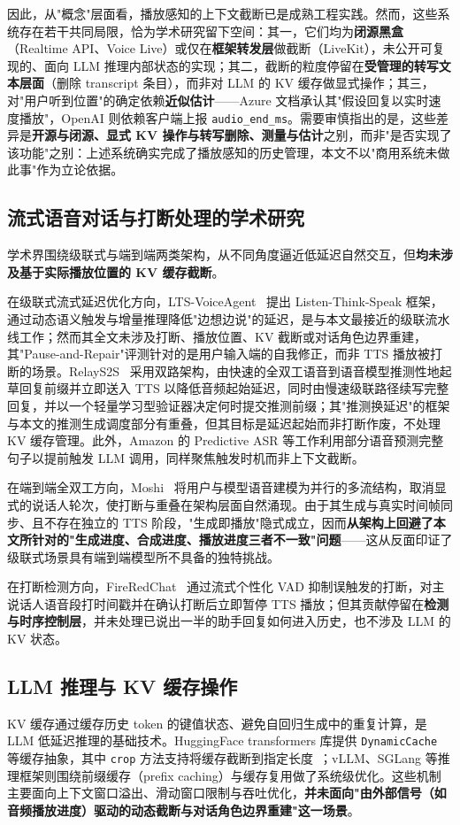 \documentclass[conference]{IEEEtran}
\theoremstyle{definition}
\begin{document}
因此，从"概念"层面看，播放感知的上下文截断已是成熟工程实践。然而，这些系统存在若干共同局限，恰为学术研究留下空间：其一，它们均为\textbf{闭源黑盒}（Realtime API、Voice Live）或仅在\textbf{框架转发层}做截断（LiveKit），未公开可复现的、面向 LLM 推理内部状态的实现；其二，截断的粒度停留在\textbf{受管理的转写文本层面}（删除 transcript 条目），而非对 LLM 的 KV 缓存做显式操作；其三，对"用户听到位置"的确定依赖\textbf{近似估计}——Azure 文档承认其"假设回复以实时速度播放"，OpenAI 则依赖客户端上报 \texttt{audio\_end\_ms}。需要审慎指出的是，这些差异是\textbf{开源与闭源、显式 KV 操作与转写删除、测量与估计}之别，而非"是否实现了该功能"之别：上述系统确实完成了播放感知的历史管理，本文不以"商用系统未做此事"作为立论依据。

\subsection{流式语音对话与打断处理的学术研究}
学术界围绕级联式与端到端两类架构，从不同角度逼近低延迟自然交互，但\textbf{均未涉及基于实际播放位置的 KV 缓存截断}。

在级联式流式延迟优化方向，LTS-VoiceAgent~\cite{lts_voiceagent} 提出 Listen-Think-Speak 框架，通过动态语义触发与增量推理降低"边想边说"的延迟，是与本文最接近的级联流水线工作；然而其全文未涉及打断、播放位置、KV 截断或对话角色边界重建，其"Pause-and-Repair"评测针对的是用户输入端的自我修正，而非 TTS 播放被打断的场景。RelayS2S~\cite{relays2s} 采用双路架构，由快速的全双工语音到语音模型推测性地起草回复前缀并立即送入 TTS 以降低音频起始延迟，同时由慢速级联路径续写完整回复，并以一个轻量学习型验证器决定何时提交推测前缀；其"推测换延迟"的框架与本文的推测生成调度部分有重叠，但其目标是延迟起始而非打断作废，不处理 KV 缓存管理。此外，Amazon 的 Predictive ASR 等工作利用部分语音预测完整句子以提前触发 LLM 调用，同样聚焦触发时机而非上下文截断。

在端到端全双工方向，Moshi~\cite{moshi} 将用户与模型语音建模为并行的多流结构，取消显式的说话人轮次，使打断与重叠在架构层面自然涌现。由于其生成与真实时间帧同步、且不存在独立的 TTS 阶段，"生成即播放"隐式成立，因而\textbf{从架构上回避了本文所针对的"生成进度、合成进度、播放进度三者不一致"问题}——这从反面印证了级联式场景具有端到端模型所不具备的独特挑战。

在打断检测方向，FireRedChat~\cite{fireredchat} 通过流式个性化 VAD 抑制误触发的打断，对主说话人语音段打时间戳并在确认打断后立即暂停 TTS 播放；但其贡献停留在\textbf{检测与时序控制层}，并未处理已说出一半的助手回复如何进入历史，也不涉及 LLM 的 KV 状态。

\subsection{LLM 推理与 KV 缓存操作}
KV 缓存通过缓存历史 token 的键值状态、避免自回归生成中的重复计算，是 LLM 低延迟推理的基础技术。HuggingFace transformers 库提供 \texttt{DynamicCache} 等缓存抽象，其中 \texttt{crop} 方法支持将缓存截断到指定长度~\cite{hf_kvcache}；vLLM、SGLang 等推理框架则围绕前缀缓存（prefix caching）与缓存复用做了系统级优化。这些机制主要面向上下文窗口溢出、滑动窗口限制与吞吐优化，\textbf{并未面向"由外部信号（如音频播放进度）驱动的动态截断与对话角色边界重建"这一场景}。
\end{document}
